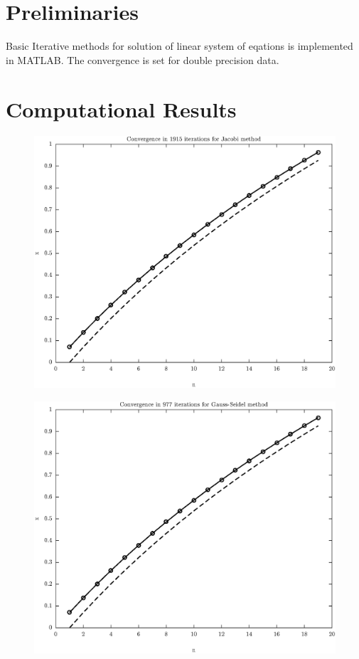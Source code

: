 \documentclass[11pt]{article}
\begin{document}
\section{Preliminaries}

Basic Iterative methods for solution of linear system of eqations is implemented in MATLAB.  The convergence is set for double precision data.

\bigskip
%

\section{Computational Results}
%
%
\begin{figure}
\centering
\begin{minipage}{.45\textwidth}
\centering
\includegraphics[width=\linewidth]{math609_pa2_comp_example_1_n_19_k_Jacobi_part_a.eps}
\label{fig:test1}
\end{minipage}\hfill
\begin{minipage}{.45\textwidth}
\centering
\includegraphics[width=\linewidth]{math609_pa2_comp_example_1_n_19_k_Gauss-Seidel_part_a.eps}

\end{minipage}
\end{figure}
\end{document}
